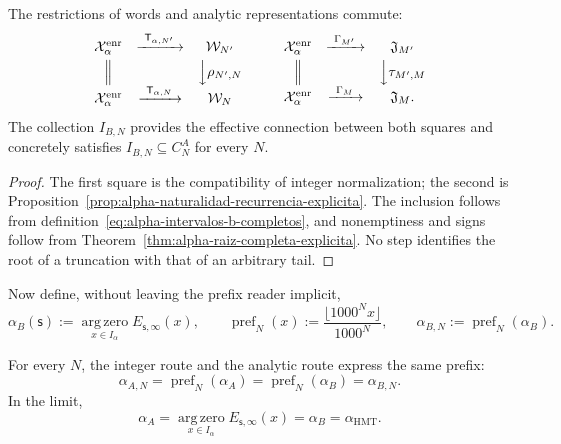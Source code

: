 \begin{proposition}
\label{prop:alpha-cuadrados-compatibilidad}
The restrictions of words and analytic representations commute:
\[
\begin{array}{ccc}
 \mathcal X_\alpha^{\mathrm{enr}}&
 \xrightarrow{\ \mathsf T_{\alpha,N'}\ }&\mathcal W_{N'}\\[1mm]
 \Big\Vert&&\Big\downarrow\rho_{N',N}\\[1mm]
 \mathcal X_\alpha^{\mathrm{enr}}&
 \xrightarrow{\ \mathsf T_{\alpha,N}\ }&\mathcal W_N
\end{array}
\qquad
\begin{array}{ccc}
 \mathcal X_\alpha^{\mathrm{enr}}&
 \xrightarrow{\ \Gamma_{M'}\ }&\mathfrak J_{M'}\\[1mm]
 \Big\Vert&&\Big\downarrow\tau_{M',M}\\[1mm]
 \mathcal X_\alpha^{\mathrm{enr}}&
 \xrightarrow{\ \Gamma_M\ }&\mathfrak J_M .
\end{array}
\]
The collection \(I_{B,N}\) provides the effective connection between both
squares and concretely satisfies
\(I_{B,N}\subseteq C_N^A\) for every \(N\).
\end{proposition}

\begin{proof}
The first square is the compatibility of integer normalization; the second
is Proposition~\ref{prop:alpha-naturalidad-recurrencia-explicita}. The
inclusion follows from definition~\eqref{eq:alpha-intervalos-b-completos},
and nonemptiness and signs follow from
Theorem~\ref{thm:alpha-raiz-completa-explicita}. No step identifies the
root of a truncation with that of an arbitrary tail.
\end{proof}

Now define, without leaving the prefix reader implicit,
\begin{equation}
 \alpha_B(\mathsf s):=
 \operatorname*{arg\,zero}_{x\in I_\alpha}E_{\mathsf s,\infty}(x),
 \qquad
 \operatorname{pref}_N(x):=
 \frac{\lfloor1000^Nx\rfloor}{1000^N},
 \qquad
 \alpha_{B,N}:=\operatorname{pref}_N(\alpha_B).
 \label{eq:alpha-definicion-b-y-prefijos-rev08}
\end{equation}

\begin{theorem}
\label{prop:alpha-dos-limites}
For every \(N\), the integer route and the analytic route express the same prefix:
\begingroup
\renewcommand{\theequation}{A7\(_0\)}
\begin{equation}
 \boxed{\alpha_{A,N}=\operatorname{pref}_N(\alpha_A)
 =\operatorname{pref}_N(\alpha_B)=\alpha_{B,N}.}
 \label{eq:alpha-dos-vias-cada-nivel}
\end{equation}
\endgroup
In the limit,
\begingroup
\renewcommand{\theequation}{A8\(_0\)}
\begin{equation}
 \boxed{\alpha_A
 =\operatorname*{arg\,zero}_{x\in I_\alpha}
       E_{\mathsf s,\infty}(x)
 =\alpha_B=\alpha_{\mathrm{HMT}}.}
 \label{eq:alpha-dos-vias-limite-coinductivo}
\end{equation}
\endgroup
\end{theorem}

